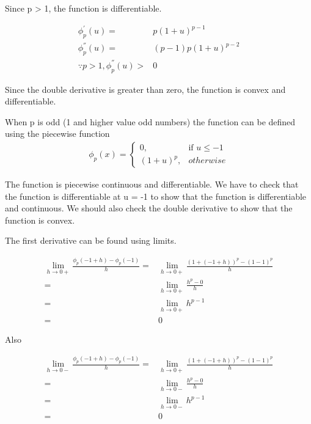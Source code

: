 \documentclass{article}
\begin{document}
\begin{description}
    Since p > 1, the function is differentiable.

    \begin{align*}
        \phi^{'}_{p}(u) = & p{(1+u)}^{p - 1} \\
        \phi^{''}_{p}(u) = & {(p - 1)}p{(1+u)}^{p - 2} \\
        \because p > 1, \phi^{''}_{p}(u) > & 0
    \end{align*}

    Since the double derivative is greater than zero, the function is convex and differentiable.


    When p is odd (1 and higher value odd numbers) the function can be defined using the piecewise function
    \begin{align*}
        \phi_{p}\left(x\right) = 
        \begin{cases}
          0, & \textrm{if } u \le -1 \\
          {(1+u)}^p, & otherwise
        \end{cases}
    \end{align*}

    The function is piecewise continuous and differentiable. We have to check that the function is differentiable at u = -1 to show that the function is differentiable and continuous.  We should also check the double derivative to show that the function is convex.

    The first derivative can be found using limits.

    \begin{align*}
      \lim_{h \to 0+} \frac{\phi_{p}(-1 + h) - \phi_{p}(-1)}{h}=&  \lim_{h \to 0+} \frac{{(1 + (-1 + h))}^{p} - {(1 -1)}^{p}}{h} \\
      = & \lim_{h \to 0+} \frac{h^{p} - 0}{h} \\
      = & \lim_{h \to 0+} h^{p - 1} \\
      = & 0
    \end{align*}

    Also 
    
    \begin{align*}
      \lim_{h \to 0-} \frac{\phi_{p}(-1 + h) - \phi_{p}(-1)}{h}=&  \lim_{h \to 0+} \frac{{(1 + (-1 + h))}^{p} - {(1 -1)}^{p}}{h} \\
      = & \lim_{h \to 0-} \frac{h^{p} - 0}{h} \\
      = & \lim_{h \to 0-} h^{p - 1} \\
      = & 0
    \end{align*}


\end{description}
\end{document}
